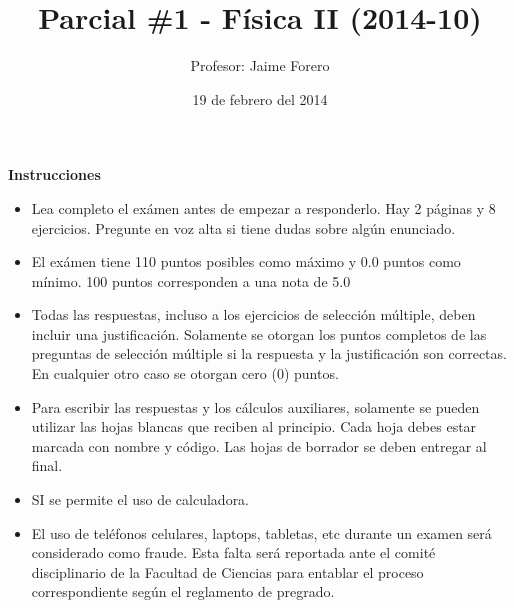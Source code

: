\documentclass{article}
\title{Parcial \#1  - Física II (2014-10)\\ }
\author{Profesor: Jaime Forero}
\date{19 de febrero del 2014}
\begin{document}
\maketitle


{\bf Instrucciones}\\
\begin{itemize}
\item
Lea completo el ex\'amen antes de empezar a responderlo. Hay 2 p\'aginas y 8 ejercicios. Pregunte en voz alta si tiene dudas sobre alg\'un enunciado.
\item
El ex\'amen tiene 110 puntos posibles  como m\'aximo y 0.0 puntos como m\'inimo. 100 puntos corresponden a una nota de 5.0
\item 
Todas las respuestas, incluso a los ejercicios de selecci\'on m\'ultiple, deben incluir una justificaci\'on. Solamente se otorgan los puntos completos de las preguntas de selecci\'on m\'ultiple si la respuesta y la justificaci\'on son correctas. En cualquier otro caso se otorgan cero (0) puntos.
\item
Para escribir las respuestas y  los c\'alculos auxiliares, solamente se pueden utilizar las hojas blancas que reciben al principio. Cada hoja debes estar marcada con nombre y c\'odigo. Las hojas de borrador se deben entregar al final.
\item SI se permite el uso de calculadora.
\item
El uso de tel\'efonos celulares, laptops, tabletas, etc durante un examen ser\'a considerado como fraude. Esta falta ser\'a reportada ante el comit\'e disciplinario de la Facultad de Ciencias para entablar el proceso correspondiente seg\'un el reglamento de pregrado. 
\end{itemize}
\end{document}
